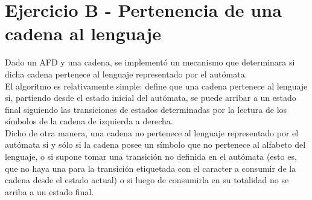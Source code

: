 \section{Ejercicio B - Pertenencia de una cadena al lenguaje}
\indent \indent Dado un AFD y una cadena, se implementó un mecanismo que determinara si dicha cadena pertenece al lenguaje representado por el autómata.\\
\indent El algoritmo es relativamente simple: define que una cadena pertenece al lenguaje si, partiendo desde el estado inicial del autómata, se puede arribar a un estado final siguiendo las transiciones de estados determinadas por la lectura de los símbolos de la cadena de izquierda a derecha.\\
\indent Dicho de otra manera, una cadena no pertenece al lenguaje representado por el autómata si y sólo si la cadena posee un símbolo que no pertenece al alfabeto del lenguaje, o si supone tomar una transición no definida en el autómata (esto es, que no haya una para la transición etiquetada con el caracter a consumir de la cadena desde el estado actual) o si luego de consumirla en su totalidad no se arriba a un estado final.\\
